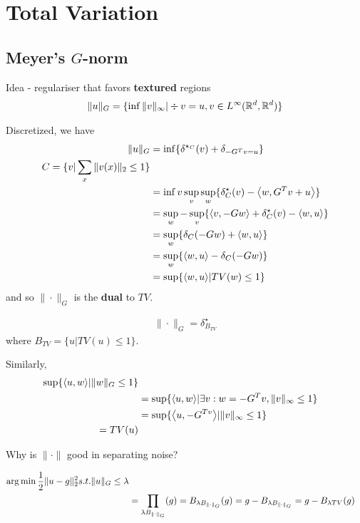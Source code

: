 \chapter{Total Variation}
\label{cha:total-variation}

\section{Meyer's $G$-norm}
\label{sec:meyers-g-norm}

Idea - regulariser that favors \textbf{textured} regions
\begin{align}
  \| u \|_{G} = \{ \inf \| v \|_{\infty} | \div v = u, v \in
  L^{\infty}(\mathbb{R}^{d}, \mathbb{R}^{d}) \}
\end{align} 

Discretized, we have
\begin{align}
  \| u \|_{G} &= \inf \{ \delta^{\star_{C}}(v) + \delta_{-G^{T} v = u}
  \} \\
  C = \{ v | \sum_{x} \| v(x) \|_{2} \leq 1 \} \\
  &= \inf v \sup_{v} \sup_{w} \{ \delta^{\star}_{C}(v) - \IP{w, G^{T}
    v + u} \} \\
  &= \sup_{w} -\sup_{v} \{ \IP{v, -Gw} + \delta^{\star}_{C}(v) -
  \IP{w, u} \} \\
  &= \sup_{w} \{ \delta_{C}(-Gw) + \IP{w, u} \} \\
  &= \sup_{w} \{ \IP{w, u} - \delta_{C}(-Gw) \} \\
  &= \sup \{ \IP{w, u} | TV(w) \leq 1 \}
\end{align} and so $\| \cdot \|_{G}$ is the \textbf{dual} to $TV$.

\begin{align}
  \| \cdot \|_{G} = \delta^{\star}_{B_{TV}}
\end{align} where $B_{TV} = \{ u | TV(u) \leq 1 \}$.

Similarly,
\begin{align}
  \sup \{ \IP{u, w} | \| w \|_{G} \leq 1 \} \\
  &= \sup \{ \IP{u, w} | \exists v: w = -G^{T}v, \| v \|_{\infty} \leq
  1 \} \\
  &= \sup \{ \IP{u, -G^{T v}} | \| v \|_{\infty} \leq 1 \} \\
  = TV(u)
\end{align}

Why is $\| \cdot \|$ good in separating noise?

\begin{align}
  \label{eq:104}
  \operatorname*{arg\,min} \frac{1}{2} \| u - g \|_{2}^{2} s.t. \| u \|_{G} \leq
  \lambda \\
  &= \prod_{\lambda B_{\| \cdot \|_{G}}}(g) = B_{\lambda B_{\| \cdot
      \|_{G}}}(g) = g - B_{\lambda B_{\| \cdot \|_{G}}} = g -
  B_{\lambda TV}(g)
\end{align}

